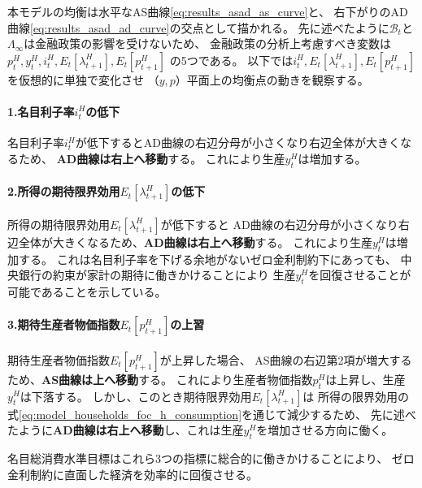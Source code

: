 本モデルの均衡は水平なAS曲線\eqref{eq:results_asad_as_curve}と、
右下がりのAD曲線\eqref{eq:results_asad_ad_curve}の交点として描かれる。
先に述べたように\(\mathcal{B}_t\)と\(\Lambda_{\infty}\)は金融政策の影響を受けないため、
金融政策の分析上考慮すべき変数は
 \(p_t^H,y_t^H,i_t^H,E_t[\lambda_{t+1}^H],E_t[p_{t+1}^H]\)
の5つである。
以下では\(i_t^H,E_t[\lambda_{t+1}^H],E_t[p_{t+1}^H]\)を仮想的に単独で変化させ
（\(y,p\)）平面上の均衡点の動きを観察する。

\paragraph{1.名目利子率\(i_t^H\)の低下}\label{sec:results_asad_policy_control_nominal_interest_rate_cut}
名目利子率\(i_t^H\)が低下するとAD曲線の右辺分母が小さくなり右辺全体が大きくなるため、
\textbf{AD曲線は右上へ移動}する。
これにより生産\(y_t^H\)は増加する。

\paragraph{2.所得の期待限界効用\(E_t[\lambda_{t+1}^H]\)の低下}\label{sec:results_asad_policy_control_expected_marginal_utility_fall}
所得の期待限界効用\(E_t[\lambda_{t+1}^H]\)が低下すると
AD曲線の右辺分母が小さくなり右辺全体が大きくなるため、\textbf{AD曲線は右上へ移動}する。
これにより生産\(y_t^H\)は増加する。
これは名目利子率を下げる余地がないゼロ金利制約下にあっても、
中央銀行の約束が家計の期待に働きかけることにより
生産\(y_t^H\)を回復させることが可能であることを示している。

\paragraph{3.期待生産者物価指数\(E_t[p_{t+1}^H]\)の上習}\label{sec:results_asad_policy_control_expected_ppi_rise}
期待生産者物価指数\(E_t[p_{t+1}^H]\)が上昇した場合、
AS曲線の右辺第2項が増大するため、\textbf{AS曲線は上へ移動}する。
これにより生産者物価指数\(p_t^H\)は上昇し、生産\(y_t^H\)は下落する。
しかし、このとき期待限界効用\(E_t[\lambda_{t+1}^H]\)は
所得の限界効用の式\eqref{eq:model_households_foc_h_consumption}を通じて減少するため、
先に述べたように\textbf{AD曲線は右上へ移動}し、これは生産\(y_t^H\)を増加させる方向に働く。

名目総消費水準目標はこれら3つの指標に総合的に働きかけることにより、
ゼロ金利制約に直面した経済を効率的に回復させる。